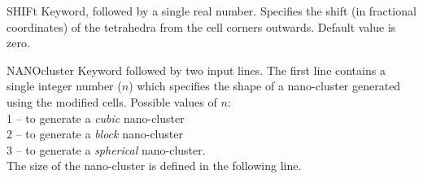 \begin{keywordlist}
\item[SHIFt]
Keyword, followed by a single real number.
Specifies the shift (in fractional coordinates) of the tetrahedra from the cell corners outwards.
Default value is zero.
\item[NANOcluster]
Keyword followed by two input lines.
The first line contains a single integer number ($n$) which specifies the shape of a nano-cluster generated using the modified cells. Possible values of $n$: \\
\hspace*{5mm}1 -- to generate a {\it cubic} nano-cluster\\
\hspace*{5mm}2 -- to generate a {\it block} nano-cluster\\
\hspace*{5mm}3 -- to generate a {\it spherical} nano-cluster.\\
The size of the nano-cluster is defined in the following line.

\end{keywordlist}
